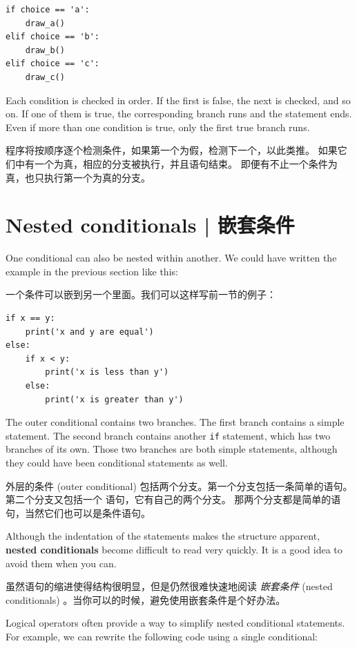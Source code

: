 {{{{\begin{lstlisting}
if choice == 'a':
    draw_a()
elif choice == 'b':
    draw_b()
elif choice == 'c':
    draw_c()
\end{lstlisting}

%
Each condition is checked in order.  If the first is false,
the next is checked, and so on.  If one of them is
true, the corresponding branch runs and the statement
ends.  Even if more than one condition is true, only the
first true branch runs.

程序将按顺序逐个检测条件，如果第一个为假，检测下一个，以此类推。
如果它们中有一个为真，相应的分支被执行，并且语句结束。
即便有不止一个条件为真，也只执行第一个为真的分支。

\section{Nested conditionals  |  嵌套条件}
  

One conditional can also be nested within another.  We could have
written the example in the previous section like this:

一个条件可以嵌到另一个里面。我们可以这样写前一节的例子：

\begin{lstlisting}
if x == y:
    print('x and y are equal')
else:
    if x < y:
        print('x is less than y')
    else:
        print('x is greater than y')
\end{lstlisting}

%
The outer conditional contains two branches.  The
first branch contains a simple statement.  The second branch
contains another {\tt if} statement, which has two branches of its
own.  Those two branches are both simple statements,
although they could have been conditional statements as well.

外层的条件 (outer conditional) 包括两个分支。第一个分支包括一条简单的语句。
第二个分支又包括一个  语句，它有自己的两个分支。
那两个分支都是简单的语句，当然它们也可以是条件语句。


Although the indentation of the statements makes the structure
apparent, {\bf nested conditionals} become difficult to read very
quickly.  It is a good idea to avoid them when you can.

虽然语句的缩进使得结构很明显，但是仍然很难快速地阅读 {\em 嵌套条件} (nested conditionals) 。当你可以的时候，避免使用嵌套条件是个好办法。

Logical operators often provide a way to simplify nested conditional
statements.  For example, we can rewrite the following code using a
single conditional:

}}}}
